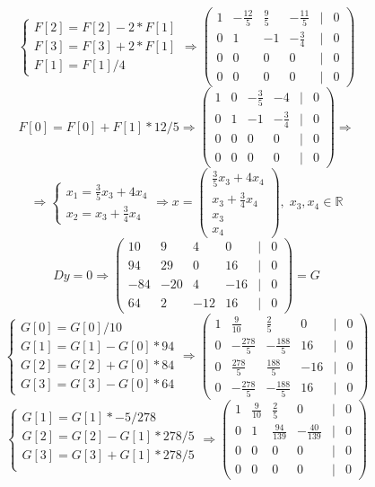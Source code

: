 \documentclass[a4paper]{article}
\newcommand{\mat}[1]{\begin{pmatrix} #1 \end{pmatrix}}
\renewcommand{\f}[2]{\frac{#1}{#2}}
\newcommand{\case}[1]{\begin{cases} #1 \end{cases}}
\renewcommand{\r}{\Rightarrow}
\newcommand{\RR}{\mathbb{R}}
\begin{document}
\begin{enumerate}
    $$\case{F[2] = F[2]-2*F[1]\\
    F[3] = F[3]+2*F[1]\\
    F[1] = F[1]/4} \r \mat{1 & -\frac{12}{5} & \frac{9}{5} & -\frac{11}{5} & | & 0 \\ 0 & 1 & -1 & -\frac{3}{4} & | & 0 \\ 0 & 0 & 0 & 0 & | & 0 \\ 0 & 0 & 0 & 0 & | & 0}$$
    $$F[0] = F[0] +F[1]*12/5 \r \mat{1 & 0 & -\frac{3}{5} & -4 & | & 0 \\ 0 & 1 & -1 & -\frac{3}{4} & | & 0 \\ 0 & 0 & 0 & 0 & | & 0 \\ 0 & 0 & 0 & 0 & | & 0}\r$$
    $$\r \case{x_1 = \f{3}{5}x_3 + 4x_4 \\ x_2 = x_3+\f{3}{4}x_4} \r x = \mat{\f{3}{5}x_3 + 4x_4 \\ x_3+\f{3}{4}x_4 \\ x_3 \\ x_4}, \; x_3, x_4 \in \RR$$
    $$Dy = 0 \r \mat{10 & 9 & 4 & 0 & | & 0\\ 94 & 29 & 0 & 16 & | & 0\\ -84 & -20 & 4 & -16 & | & 0\\ 64 & 2 & -12 & 16& | & 0} = G$$
    $$\case{G[0]  = G[0]/10\\
    G[1] = G[1]-G[0]*94\\
    G[2] = G[2]+G[0]*84\\
    G[3] = G[3]-G[0]*64} \r \mat{1 & \frac{9}{10} & \frac{2}{5} & 0 & | & 0 \\ 0 & -\frac{278}{5} & -\frac{188}{5} & 16 & | & 0 \\ 0 & \frac{278}{5} & \frac{188}{5} & -16 & | & 0 \\ 0 & -\frac{278}{5} & -\frac{188}{5} & 16 & | & 0}$$
    $$\case{
    G[1] = G[1]*-5/278\\
    G[2] = G[2] - G[1]*278/5\\
    G[3] = G[3] + G[1]*278/5\\
    }\r \mat{1 & \frac{9}{10} & \frac{2}{5} & 0 & | & 0 \\ 0 & 1 & \frac{94}{139} & -\frac{40}{139} & | & 0 \\ 0 & 0 & 0 & 0 & | & 0 \\ 0 & 0 & 0 & 0 & | & 0}$$


\end{enumerate}
\end{document}
